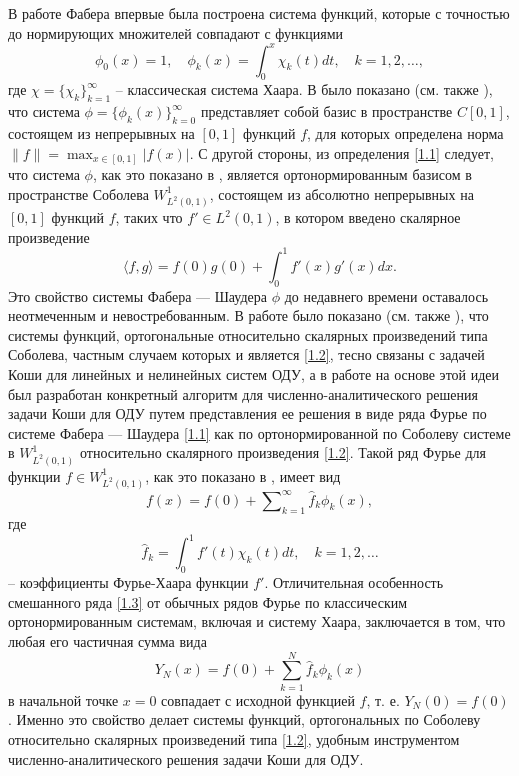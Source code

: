 \Introduction
В работе Фабера \cite{Faber} впервые была построена система функций, которые с точностью до нормирующих множителей совпадают с функциями
\begin{equation}\label{1.1}
\phi_{0}(x)=1, \quad \phi_{k}(x)=\int_{0}^{x}\chi_k(t)dt, \quad k=1,2,\ldots,
\end{equation}
где  $\chi=\{\chi_k\}_{k=1}^\infty$ --   классическая система Хаара.
В \cite{Faber} было показано (см. также \cite{Shauder}), что  система $\phi=\{\phi_k(x)\}_{k=0}^\infty$  представляет собой базис в пространстве $C[0,1]$, состоящем из непрерывных на $[0,1]$ функций $f$, для которых определена норма $\|f\|=\max_{x\in[0,1]}|f(x)|$. С другой стороны, из определения \eqref{1.1} следует, что система $\phi$, как это показано в \cite{SharIzv2018},  является ортонормированным базисом в  пространстве Соболева $W^1_{L^2(0,1)}$, состоящем из абсолютно непрерывных на $[0,1]$ функций $f$, таких что $f'\in L^2(0,1)$, в котором введено скалярное произведение
\begin{equation}\label{1.2}
\langle f,g\rangle=f(0)g(0)+\int_{0}^1f'(x)g'(x)dx.
\end{equation}
Это свойство системы Фабера --- Шаудера $\phi$ до недавнего времени \cite{SharIzv2018} оставалось неотмеченным и невостребованным. В работе \cite{SharIzv2018} было показано (см. также \cite{SharDiffur2018}), что системы функций, ортогональные относительно скалярных произведений типа Соболева, частным случаем которых и является \eqref{1.2}, тесно связаны с задачей Коши для линейных и нелинейных систем ОДУ, а в работе  \cite{MMG2016} на основе этой идеи был разработан конкретный алгоритм для численно-аналитического решения задачи Коши для  ОДУ путем представления ее решения в виде ряда Фурье по системе Фабера --- Шаудера \eqref{1.1} как по ортонормированной по Соболеву системе в $W^1_{L^2(0,1)}$ относительно скалярного произведения \eqref{1.2}. Такой ряд Фурье для функции $f\in W^1_{L^2(0,1)}$, как это показано в \cite{SharIzv2018}, имеет вид
\begin{equation}\label{1.3}
f(x)=f(0)+\sum\nolimits_{k=1}^\infty \hat f_k \phi_{k}(x),
\end{equation}
где
\begin{equation}\label{1.4}
\hat f_k=\int_{0}^1f'(t)\chi_{k}(t)dt, \quad k=1,2,\ldots
\end{equation}
-- коэффициенты Фурье-Хаара функции $f'$. Отличительная особенность смешанного ряда \eqref{1.3} от обычных рядов Фурье по классическим ортонормированным системам, включая и систему Хаара, заключается в том, что любая его частичная сумма вида
\begin{equation}\label{1.5}
Y_N(x)=f(0)+\sum_{k=1}^N \hat f_k \phi_{k}(x)
\end{equation}
в начальной точке $x=0$ совпадает с исходной функцией $f$, т. е. $Y_N(0)=f(0)$. Именно это свойство делает системы функций, ортогональных по Соболеву относительно скалярных произведений типа \eqref{1.2}, удобным инструментом  численно-аналитического решения задачи Коши для ОДУ.

